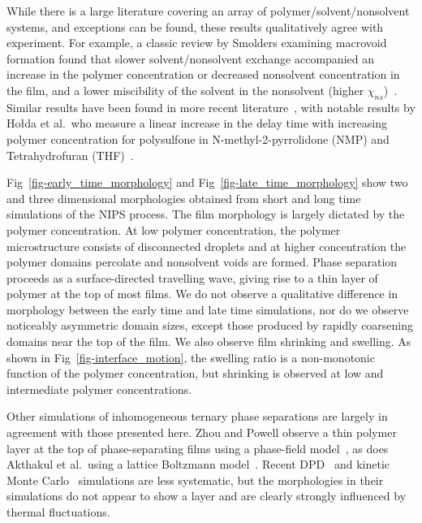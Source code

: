 \documentclass[journal=mamobx, layout=twocolumn]{achemso}
\begin{document}
While there is a large literature covering an array of polymer/solvent/nonsolvent systems, and exceptions can be found, these results qualitatively agree with experiment.
For example, a classic review by Smolders examining macrovoid formation found that slower solvent/nonsolvent exchange accompanied 
an increase in the polymer concentration or decreased nonsolvent concentration in the film, and a lower miscibility of the solvent in the nonsolvent (higher $\chi_{ns}$)~\cite{Smolders1992}.
Similar results have been found in more recent literature~\cite{Nguyen1987, McHugh1992, Gaides1992, Barth2000, Holda2013, Guillen2013, Zhang2016h, Udoh2016}, with notable results by Ho{\l}da et al.\ who measure a linear increase in the delay time with increasing polymer concentration for polysulfone in N-methyl-2-pyrrolidone (NMP) and Tetrahydrofuran (THF)~\cite{Holda2013}.

Fig~\ref{fig-early_time_morphology} and Fig~\ref{fig-late_time_morphology} show two and three dimensional morphologies obtained from short and long time simulations of the NIPS process.
The film morphology is largely dictated by the polymer concentration.
At low polymer concentration, the polymer microstructure consists of disconnected droplets and at higher concentration the polymer domains percolate and nonsolvent voids are formed.
Phase separation proceeds as a surface-directed travelling wave, giving rise to a thin layer of polymer at the top of most films.
We do not observe a qualitative difference in morphology between the early time and late time simulations, nor do we observe noticeably asymmetric domain sizes, except those produced by rapidly coarsening domains near the top of the film.
We also observe film shrinking and swelling. 
As shown in Fig~\ref{fig-interface_motion}, the swelling ratio is a non-monotonic function of the polymer concentration, but shrinking is observed at low and intermediate polymer concentrations.

Other simulations of inhomogeneous ternary phase separations are largely in agreement with those presented here.
Zhou and Powell observe a thin polymer layer at the top of phase-separating films using a phase-field model~\cite{Zhou2006}, as does Akthakul et al.\ using a lattice Boltzmann model~\cite{Akthakul2005}.
Recent DPD~\cite{Wang2008} and kinetic Monte Carlo~\cite{Termonia1994, He2011} simulations are less systematic, but the morphologies in their simulations do not appear to show a layer and are clearly strongly influenced by thermal fluctuations.
\end{document}

